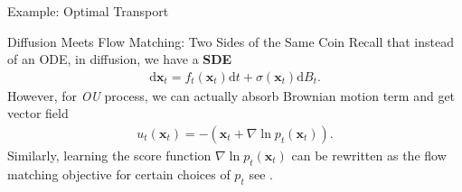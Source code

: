 \documentclass{beamer}
\begin{document}
\begin{frame}{Example: Optimal Transport}
\end{frame}

\begin{frame}{Diffusion Meets Flow Matching: Two Sides of the Same Coin \citep{gaoDiffusionMeetsFlow2024}}
    Recall that instead of an ODE, in diffusion, we have a \textbf{SDE}
    \begin{align*}
        \mathrm{d}\mathbf{x}_t = f_t(\mathbf{x}_t)\mathrm{d}t + \sigma(\mathbf{x}_t) \mathrm{d}B_t
    .\end{align*}
    However, for \emph{OU} process, we can actually absorb Brownian motion term and get vector field
    \begin{align*}
        u_t(\mathbf{x}_t) = -(\mathbf{x}_t + \nabla \ln p_t(\mathbf{x}_t))
    .\end{align*}
    Similarly, learning the score function \( \nabla \ln p_t(\mathbf{x}_t) \) can be rewritten as the flow matching objective for certain choices of \( p_t \) see \citep{lipmanFlowMatchingGuide2024a}.
\end{frame}
\end{document}
